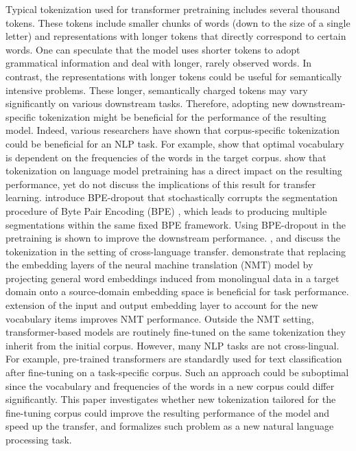 \documentclass[review]{elsarticle}
\begin{document}
Typical tokenization used for transformer pretraining includes several thousand tokens. These tokens include smaller chunks of words (down to the size of a single letter) and representations with longer tokens that directly correspond to certain words. One can speculate that the model uses shorter tokens to adopt grammatical information and deal with longer, rarely observed words. In contrast, the representations with longer tokens could be useful for semantically intensive problems. These longer, semantically charged tokens may vary significantly on various downstream tasks. Therefore, adopting new downstream-specific tokenization might be beneficial for the performance of the resulting model. Indeed, various researchers have shown that corpus-specific tokenization could be beneficial for an NLP task. For example, \cite{sennrich-etal-2016-neural} show that optimal vocabulary is dependent on the frequencies of the words in the target corpus. \cite{bostrom2020byte} show that tokenization on language model pretraining has a direct impact on the resulting performance, yet do not discuss the implications of this result for transfer learning. \cite{provilkov2020bpe} introduce BPE-dropout that stochastically corrupts the segmentation procedure of Byte Pair Encoding (BPE)  \cite{sennrich-etal-2016-neural, gage1994new}, which leads to producing multiple segmentations within the same fixed BPE framework. Using BPE-dropout in the pretraining is shown to improve the downstream performance.  \cite{lakew2019controlling}, \cite{aji2020neural} and \cite{wang2021multi} discuss the tokenization in the setting of cross-language transfer.  \cite{sato2020vocabulary} demonstrate that replacing the embedding layers of the neural machine translation (NMT) model by projecting general word embeddings induced from monolingual data in a target domain onto a source-domain embedding space is beneficial for task performance. \cite{chronopoulou2020lmu} extension of the input and output embedding layer to account for the new vocabulary items improves NMT performance. Outside the NMT setting, transformer-based models are routinely fine-tuned on the same tokenization they inherit from the initial corpus. However, many NLP tasks are not cross-lingual. For example, pre-trained transformers are standardly used for text classification after fine-tuning on a task-specific corpus. Such an approach could be suboptimal since the vocabulary and frequencies of the words in a new corpus could differ significantly. This paper investigates whether new tokenization tailored for the fine-tuning corpus could improve the resulting performance of the model and speed up the transfer, and formalizes such problem as a new natural language processing task. 
\end{document}
